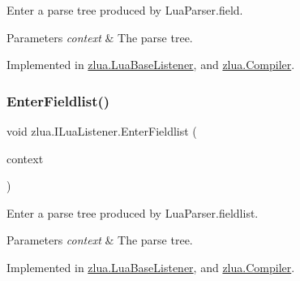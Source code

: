 Enter a parse tree produced by Lua\+Parser.\+field. 


\begin{DoxyParams}{Parameters}
{\em context} & The parse tree.\\
\hline
\end{DoxyParams}


Implemented in \mbox{\hyperlink{classzlua_1_1_lua_base_listener_a6bfe7b609f8393a7987e3746efa50769}{zlua.\+Lua\+Base\+Listener}}, and \mbox{\hyperlink{classzlua_1_1_compiler_a52a01acfde2fcb93cbec5f59549288da}{zlua.\+Compiler}}.

\mbox{\label{interfacezlua_1_1_i_lua_listener_a52d5768d4a26b0d78da5e039713269cc}} 
\subsubsection{\texorpdfstring{Enter\+Fieldlist()}{EnterFieldlist()}}
{\footnotesize\ttfamily void zlua.\+I\+Lua\+Listener.\+Enter\+Fieldlist (\begin{DoxyParamCaption}\item[{\mbox{[}\+Not\+Null\mbox{]} \mbox{\hyperlink{classzlua_1_1_lua_parser_1_1_fieldlist_context}{Lua\+Parser.\+Fieldlist\+Context}}}]{context }\end{DoxyParamCaption})}



Enter a parse tree produced by Lua\+Parser.\+fieldlist. 


\begin{DoxyParams}{Parameters}
{\em context} & The parse tree.\\
\hline
\end{DoxyParams}


Implemented in \mbox{\hyperlink{classzlua_1_1_lua_base_listener_a099787479e7da4a336dce23de123fa0a}{zlua.\+Lua\+Base\+Listener}}, and \mbox{\hyperlink{classzlua_1_1_compiler_a4f33b0f6f14a3497db13c22e4d03a10f}{zlua.\+Compiler}}.

\mbox{\label{interfacezlua_1_1_i_lua_listener_a9ee512ebb70fc9f3fe8bcc35b0e6efe4}} 
